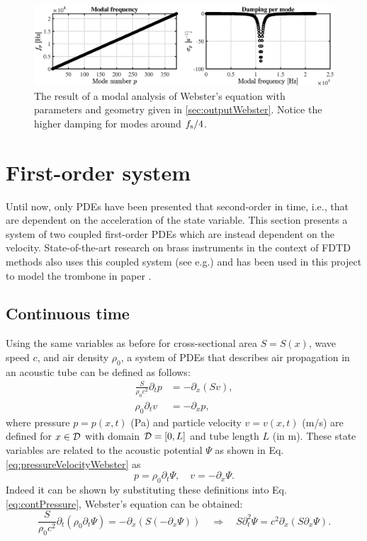{\begin{figure}[h]
    \centering
    \includegraphics[width=\textwidth]{figures/resonators/brass/webstersModes.eps}
    \caption{The result of a modal analysis of Webster's equation with parameters and geometry given in \ref{sec:outputWebster}. Notice the higher damping for modes around $f_\text{s}/4$. \label{fig:webstersModes}}
\end{figure}

\section{First-order system}\label{sec:firstOrderSystem}
Until now, only PDEs  have been presented that second-order in time, i.e., that are dependent on the acceleration of the state variable. This section presents a system of two coupled first-order PDEs which are instead dependent on the velocity. State-of-the-art research on brass instruments in the context of FDTD methods also uses this coupled system (see e.g.\cite{Bilbao2016, Harrison2018}) and has been used in this project to model the trombone in paper \citeP[H].

\subsection{Continuous time}
Using the same variables as before for cross-sectional area $S=S(x)$, wave speed $c$, and air density $\rho_0$, a system of PDEs that describes air propagation in an acoustic tube can be defined as follows:
\begin{subequations}\label{eq:firstOrderSystem}
\begin{align}
    \frac{S}{\rho_0 c^2}\partial_t p &= -\partial_x(Sv),\label{eq:contPressure}\\
    \rho_0\partial_tv &= -\partial_xp\label{eq:discVelocity},
\end{align}
\end{subequations}
where pressure $p = p(x,t)$ (Pa) and particle velocity $v = v(x,t)$ (m/s) are defined for $x\in \mathcal{D}$ with domain $\mathcal{D} = [0, L]$ and tube length $L$ (in m). These state variables are related to the acoustic potential $\Psi$ as shown in Eq. \eqref{eq:pressureVelocityWebster} as
\begin{equation}\label{eq:pressureVelocityFirstOrder}
    p = \rho_0\partial_t \Psi, \quad v = -\partial_x\Psi.
\end{equation}  
Indeed it can be shown by substituting these definitions into Eq. \eqref{eq:contPressure}, Webster's equation can be obtained:
\begin{equation}
  \nonumber
        \frac{S}{\rho_0 c^2}\partial_t(\rho_0 \partial_t\Psi) = -\partial_x(S(-\partial_x\Psi))\quad \Longrightarrow \quad S\partial_t^2\Psi = c^2\partial_x(S\partial_x\Psi).
\end{equation}


}
